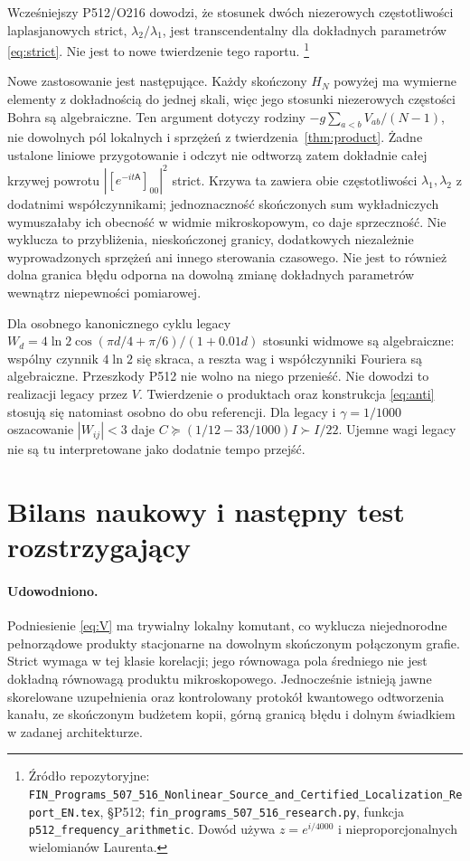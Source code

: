 \documentclass[11pt,a4paper]{article}
\begin{document}
Wcześniejszy P512/O216 dowodzi, że stosunek dwóch niezerowych
częstotliwości laplasjanowych strict, $\lambda_2/\lambda_1$, jest
transcendentalny dla dokładnych parametrów \eqref{eq:strict}.
Nie jest to nowe twierdzenie tego raportu.
\footnote{Źródło repozytoryjne:
\texttt{FIN\_Programs\_507\_516\_Nonlinear\_Source\_and\_Certified\_Localization\_Report\_EN.tex},
§P512; \texttt{fin\_programs\_507\_516\_research.py}, funkcja
\texttt{p512\_frequency\_arithmetic}. Dowód używa
$z=e^{i/4000}$ i nieproporcjonalnych wielomianów Laurenta.}

Nowe zastosowanie jest następujące. Każdy skończony $H_N$ powyżej
ma wymierne elementy z dokładnością do jednej skali, więc jego
stosunki niezerowych częstości Bohra są algebraiczne.
Ten argument dotyczy rodziny $-g\sum_{a<b}V_{ab}/(N-1)$, nie
dowolnych pól lokalnych i sprzężeń z twierdzenia~\ref{thm:product}.
Żadne ustalone liniowe przygotowanie i odczyt nie odtworzą zatem
dokładnie całej krzywej powrotu $|[e^{-it\mathsf A}]_{00}|^2$ strict.
Krzywa ta zawiera obie częstotliwości $\lambda_1,\lambda_2$ z
dodatnimi współczynnikami; jednoznaczność skończonych sum wykładniczych
wymuszałaby ich obecność w widmie mikroskopowym, co daje sprzeczność.
Nie wyklucza to przybliżenia, nieskończonej granicy, dodatkowych
niezależnie wyprowadzonych sprzężeń ani innego sterowania czasowego.
Nie jest to również dolna granica błędu odporna na dowolną zmianę
dokładnych parametrów wewnątrz niepewności pomiarowej.

Dla osobnego kanonicznego cyklu legacy
$W_d=4\ln2\cos(\pi d/4+\pi/6)/(1+0.01d)$ stosunki widmowe są
algebraiczne: wspólny czynnik $4\ln2$ się skraca, a reszta wag
i współczynniki Fouriera są algebraiczne. Przeszkody P512 nie
wolno na niego przenieść. Nie dowodzi to realizacji legacy przez $V$.
Twierdzenie o produktach oraz konstrukcja \eqref{eq:anti} stosują się
natomiast osobno do obu referencji. Dla legacy i $\gamma=1/1000$
oszacowanie $|W_{ij}|<3$ daje $C\succeq(1/12-33/1000)I\succ I/22$.
Ujemne wagi legacy nie są tu interpretowane jako dodatnie tempo przejść.

\section{Bilans naukowy i następny test rozstrzygający}

\paragraph{Udowodniono.}
Podniesienie \eqref{eq:V} ma trywialny lokalny komutant, co wyklucza
niejednorodne pełnorządowe produkty stacjonarne na dowolnym skończonym
połączonym grafie. Strict wymaga w tej klasie korelacji; jego równowaga
pola średniego nie jest dokładną równowagą produktu mikroskopowego.
Jednocześnie istnieją jawne skorelowane uzupełnienia oraz kontrolowany
protokół kwantowego odtworzenia kanału, ze skończonym budżetem kopii,
górną granicą błędu i dolnym świadkiem w zadanej architekturze.
\end{document}
